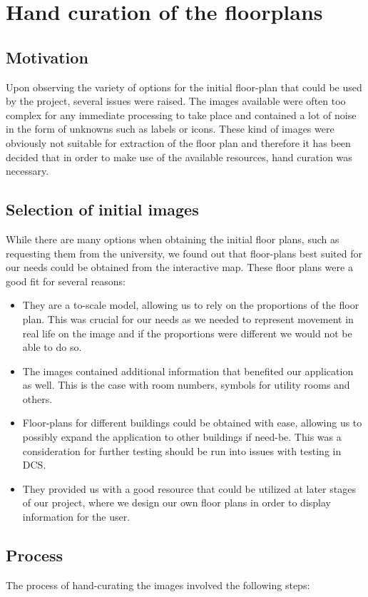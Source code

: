 \documentclass[main.tex]{subfiles}
\begin{document}
    \section{Hand curation of the floorplans}
    \subsection{Motivation}
		Upon observing  the variety of options for the initial floor-plan that could be used by the project, several issues were raised. The images available were often too complex for any immediate processing to take place and contained a lot of noise in the form of unknowns such as labels or icons. These kind of images were obviously not suitable for extraction of the floor plan and therefore it has been decided that in order to make use of the available resources, hand curation was necessary.
		\subsection{Selection of initial images}
		While there are many options when  obtaining the initial floor plans, such as requesting them from the university, we found out that floor-plans best suited for our needs could be obtained from the interactive map. These floor plans were a good fit for several reasons:
		
		\begin{itemize}
			\item They are a to-scale model, allowing us to rely on the proportions of the floor plan. This  was crucial for our needs as we needed to represent movement in real life on the image and if the proportions were different we would not be able to do so.
			\item The images contained additional information that benefited our application as well. This is the case with room numbers, symbols for utility rooms and others.
			\item Floor-plans for different buildings could be obtained with ease, allowing us to possibly expand the application to other buildings if need-be. This was a consideration for further testing should be run into issues with testing in DCS.
			\item They provided us with a good resource that could be utilized at later stages of our project, where we design our own floor plans in order to display information for the user.
		\end{itemize}
		
		\subsection{Process}
		The process of hand-curating the images involved the following steps:
		
\end{document}
